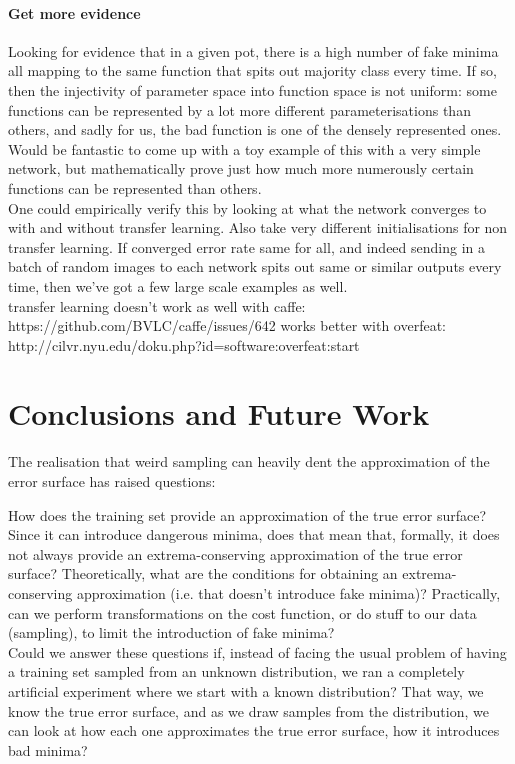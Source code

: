 \documentclass[a4paper,11pt]{article}
\begin{document}
\paragraph{Get more evidence}

Looking for evidence that in a given pot, there is a high number of fake minima all mapping to the same function that spits out majority class every time. If so, then the injectivity of parameter space into function space is not uniform: some functions can be represented by a lot more different parameterisations than others, and sadly for us, the bad function is one of the densely represented ones. Would be fantastic to come up with a toy example of this with a very simple network, but mathematically prove just how much more numerously certain functions can be represented than others. \\

One could empirically verify this by looking at what the network converges to with and without transfer learning. Also take very different initialisations for non transfer learning. If converged error rate same for all, and indeed sending in a batch of random images to each network spits out same or similar outputs every time, then we've got a few large scale examples as well. \\

transfer learning doesn't work as well with caffe:
https://github.com/BVLC/caffe/issues/642
works better with overfeat: http://cilvr.nyu.edu/doku.php?id=software:overfeat:start


\clearpage
\section{Conclusions and Future Work}

The realisation that weird sampling can heavily dent the approximation of the error surface has raised questions:

How does the training set provide an approximation of the true error surface? Since it can introduce dangerous minima, does that mean that, formally, it does not always provide an extrema-conserving approximation of the true error surface? Theoretically, what are the conditions for obtaining an extrema-conserving approximation (i.e. that doesn't introduce fake minima)? Practically, can we perform transformations on the cost function, or do stuff to our data (sampling), to limit the introduction of fake minima?  \\

Could we answer these questions if, instead of facing the usual problem of having a training set sampled from an unknown distribution, we ran a completely artificial experiment where we start with a known distribution? That way, we know the true error surface, and as we draw samples from the distribution, we can look at how each one approximates the true error surface, how it introduces bad minima? \\
\end{document}
